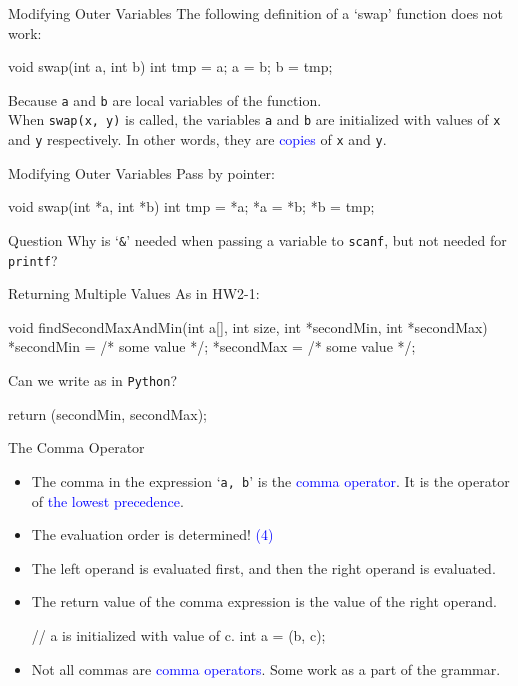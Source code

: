 \documentclass[handout]{beamer}
\newcommand{\blue}[1]{\textcolor{blue}{#1}}
\newcommand{\ttt}[1]{\texttt{#1}}
\newenvironment{question}{\begin{alertblock}{Question}}{\end{alertblock}}
\begin{document}
\begin{frame}[fragile]{Modifying Outer Variables}
	The following definition of a `swap' function does not work:
	\begin{cpp}
void swap(int a, int b) {
  int tmp = a;
  a = b;
  b = tmp;
}
	\end{cpp}
	\pause
	Because \ttt{a} and \ttt{b} are local variables of the function.\\
	When \ttt{swap(x, y)} is called, the variables \ttt{a} and \ttt{b} are initialized with values of \ttt{x} and \ttt{y} respectively. In other words, they are \blue{copies} of \ttt{x} and \ttt{y}.
\end{frame}

\begin{frame}[fragile]{Modifying Outer Variables}
	Pass by pointer:
	\begin{cpp}
void swap(int *a, int *b) {
  int tmp = *a;
  *a = *b;
  *b = tmp;
}
	\end{cpp}
	\pause
	\begin{question}
		Why is `\ttt{\&}' needed when passing a variable to \ttt{scanf}, but not needed for \ttt{printf}?
	\end{question}
\end{frame}

\begin{frame}[fragile]{Returning Multiple Values}
	As in HW2-1:
	\begin{cpp}
void findSecondMaxAndMin(int a[], int size, int *secondMin, int *secondMax) {
  *secondMin = /* some value */;
  *secondMax = /* some value */;
}
	\end{cpp}
	\pause
	Can we write as in \ttt{Python}?
	\begin{cpp}
return (secondMin, secondMax);
	\end{cpp}
\end{frame}

\begin{frame}[fragile]{The Comma Operator}
	\begin{itemize}
		\item The comma in the expression `\ttt{a, b}' is the \blue{comma operator}. It is the operator of \blue{the lowest precedence}.
		\pause
		\item The evaluation order is determined! \blue{(4)}
		\item The left operand is evaluated first, and then the right operand is evaluated.
		\item The return value of the comma expression is the value of the right operand.
		\begin{cpp}
// a is initialized with value of c.
int a = (b, c);
		\end{cpp}
		\pause
		\item Not all commas are \blue{comma operators}. Some work as a part of the grammar.
	\end{itemize}
\end{frame}
\end{document}
